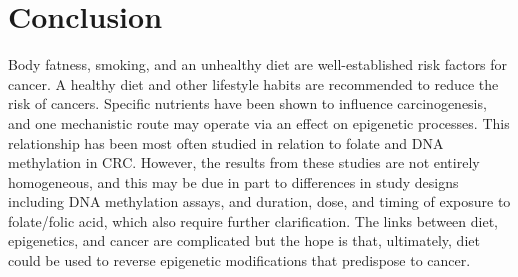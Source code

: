 \section{Conclusion} %
\noindent Body fatness, smoking, and an unhealthy diet are well-established risk factors for cancer. A healthy diet and other lifestyle habits are recommended to reduce the risk of cancers. Specific nutrients have been shown to influence carcinogenesis, and one mechanistic route may operate via an effect on epigenetic processes. This relationship has been most often studied in relation to folate and DNA methylation in CRC. However, the results from these studies are not entirely homogeneous, and this may be due in part to differences in study designs including DNA methylation assays, and duration, dose, and timing of exposure to folate/folic acid, which also require further clarification. The links between diet, epigenetics, and cancer are complicated but the hope is that, ultimately, diet could be used to reverse epigenetic modifications that predispose to cancer. 
 

